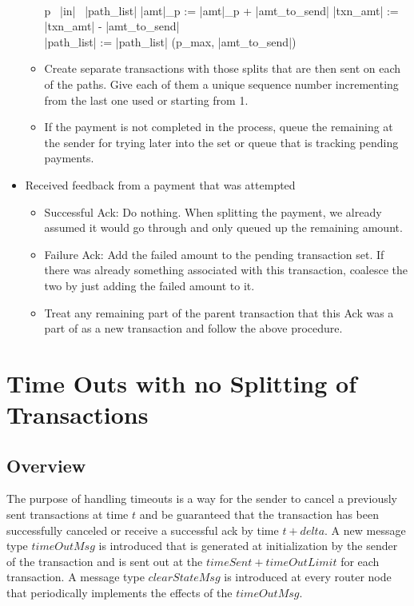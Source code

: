 \documentclass[a4paper]{article}
\begin{document}
\begin{itemize}
\begin{itemize}
\begin{program}
                  ~\\
                  \FOR p \  |in| \ |path_list| \DO
		    |amt|_p := |amt|_p + |amt_to_send|
		    |txn_amt| := |txn_amt| - |amt_to_send|
		  \END
                  ~\\

		  |path_list| := |path_list| \cup (p_{max}, |amt_to_send|)
		\END
            \END

		\end{program}

            \item Create separate transactions with those splits that are then sent on each of the paths. Give each of them a unique sequence number incrementing from the last one used or starting
                from 1.

            \item If the payment is not completed in the process, queue the remaining at the sender for trying later into the set or queue that is tracking pending payments.
        \end{itemize}

    \item Received feedback from a payment that was attempted
        \begin{itemize}
            \item Successful Ack: Do nothing. When splitting the payment, we already assumed it would go through and only queued up the remaining amount.
            \item Failure Ack: Add the failed amount to the pending transaction set. If there was already something associated with this transaction, coalesce the two by just adding the failed amount to it.
            \item Treat any remaining part of the parent transaction that this Ack was a part of as a new transaction and follow the above procedure.

        \end{itemize}
\end{itemize}
\section{Time Outs with no Splitting of Transactions}
\subsection{Overview}
The purpose of handling timeouts is a way for the sender to cancel a previously sent transactions at time $t$ and be guaranteed that the transaction has been successfully canceled or receive a successful ack by time $t+delta$. A new message type $timeOutMsg$ is introduced that is generated at initialization by the sender of the transaction and is sent out at the $timeSent + timeOutLimit$  for each transaction. A message type $clearStateMsg$ is introduced at every router node that periodically implements the effects of the $timeOutMsg$.
\end{document}
